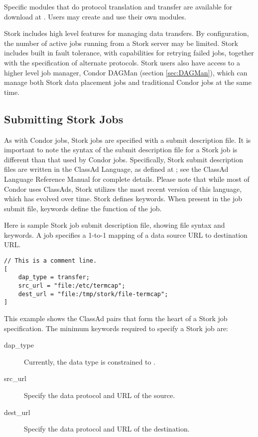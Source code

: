 Specific modules that do protocol translation and transfer
are available for download at
.
Users may create and use their own modules.

Stork includes high level features for managing data transfers.
By configuration, the number of active jobs running
from a Stork server may be limited.
Stork includes built in fault tolerance,
with capabilities for retrying failed jobs,
together with the specification of alternate protocols.
Stork users also have access to a higher level job manager, 
Condor DAGMan (section \ref{sec:DAGMan}),
which can manage both Stork data placement jobs
and traditional Condor jobs at the same time.


\subsection{\label{sec:Stork-Job-Submission}Submitting Stork Jobs}

As with Condor jobs, Stork jobs are specified with a
submit description file.
It is important to note the syntax of the submit description file
for a Stork job is different than that used by Condor jobs.
Specifically,
Stork submit description files are written in the
ClassAd Language, as defined at
;
see the ClassAd Language Reference Manual for complete details.
Please note that while most of Condor uses ClassAds,
Stork utilizes the most recent version of this language,
which has evolved over time.
Stork defines keywords.
When present in the job submit file,
keywords define the function of the job.

Here is sample Stork job submit description file,
showing file syntax and keywords.
A job specifies a 1-to-1 mapping of a data source URL to
destination URL.

\footnotesize
\begin{verbatim}
// This is a comment line.
[
    dap_type = transfer;
    src_url = "file:/etc/termcap";
    dest_url = "file:/tmp/stork/file-termcap";
]
\end{verbatim}
\normalsize


This example shows the ClassAd pairs that form the
heart of a Stork job specification.
The minimum keywords required to specify a Stork job are:

\begin{description}
  \item[dap\_type] Currently, the data type is constrained to 
  .

  \item[src\_url]  Specify the data protocol and URL of the source.

  \item[dest\_url]  Specify the data protocol and URL of the destination.
\end{description}

